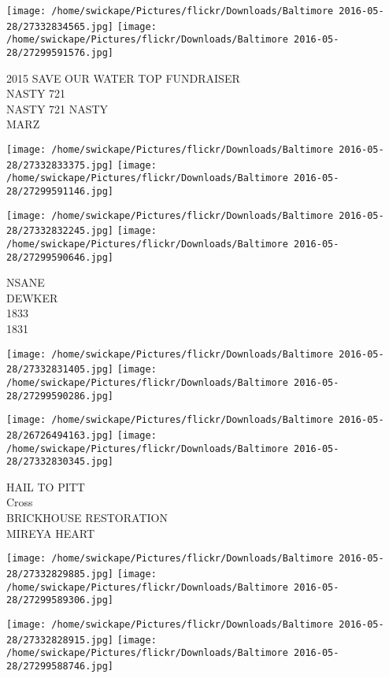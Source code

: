 \documentclass[10pt,letterpaper]{article}
\begin{document}
\texttt{[image: /home/swickape/Pictures/flickr/Downloads/Baltimore 2016-05-28/27332834565.jpg]}
\texttt{[image: /home/swickape/Pictures/flickr/Downloads/Baltimore 2016-05-28/27299591576.jpg]}

2015 SAVE OUR WATER TOP FUNDRAISER\\
NASTY 721\\
NASTY 721 NASTY\\
MARZ\\
\pagebreak

\texttt{[image: /home/swickape/Pictures/flickr/Downloads/Baltimore 2016-05-28/27332833375.jpg]}
\texttt{[image: /home/swickape/Pictures/flickr/Downloads/Baltimore 2016-05-28/27299591146.jpg]}

\texttt{[image: /home/swickape/Pictures/flickr/Downloads/Baltimore 2016-05-28/27332832245.jpg]}
\texttt{[image: /home/swickape/Pictures/flickr/Downloads/Baltimore 2016-05-28/27299590646.jpg]}

NSANE\\
DEWKER\\
1833\\
1831\\
\pagebreak

\texttt{[image: /home/swickape/Pictures/flickr/Downloads/Baltimore 2016-05-28/27332831405.jpg]}
\texttt{[image: /home/swickape/Pictures/flickr/Downloads/Baltimore 2016-05-28/27299590286.jpg]}

\texttt{[image: /home/swickape/Pictures/flickr/Downloads/Baltimore 2016-05-28/26726494163.jpg]}
\texttt{[image: /home/swickape/Pictures/flickr/Downloads/Baltimore 2016-05-28/27332830345.jpg]}

HAIL TO PITT\\
Cross\\
BRICKHOUSE RESTORATION\\
MIREYA HEART\\
\pagebreak

\texttt{[image: /home/swickape/Pictures/flickr/Downloads/Baltimore 2016-05-28/27332829885.jpg]}
\texttt{[image: /home/swickape/Pictures/flickr/Downloads/Baltimore 2016-05-28/27299589306.jpg]}

\texttt{[image: /home/swickape/Pictures/flickr/Downloads/Baltimore 2016-05-28/27332828915.jpg]}
\texttt{[image: /home/swickape/Pictures/flickr/Downloads/Baltimore 2016-05-28/27299588746.jpg]}
\end{document}
